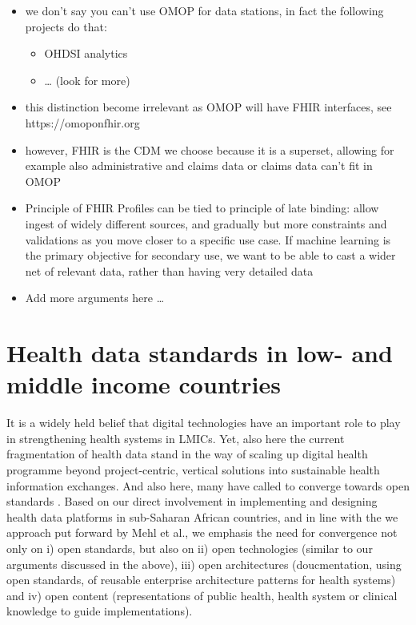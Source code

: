 \documentclass[
  authoryear]{elsarticle}
\providecommand{\tightlist}{%
  \setlength{\itemsep}{0pt}\setlength{\parskip}{0pt}}\usepackage{longtable,booktabs,array}
\begin{document}
\begin{itemize}
\item
  we don't say you can't use OMOP for data stations, in fact the
  following projects do that:

  \begin{itemize}
  \tightlist
  \item
    OHDSI analytics \citep{khalid2021standardized}
  \item
    \ldots{} (look for more)
  \end{itemize}
\item
  this distinction become irrelevant as OMOP will have FHIR interfaces,
  see https://omoponfhir.org
\item
  however, FHIR is the CDM we choose because it is a superset, allowing
  for example also administrative and claims data or claims data can't
  fit in OMOP
\item
  Principle of FHIR Profiles can be tied to principle of late binding:
  allow ingest of widely different sources, and gradually but more
  constraints and validations as you move closer to a specific use case.
  If machine learning is the primary objective for secondary use, we
  want to be able to cast a wider net of relevant data, rather than
  having very detailed data
\item
  Add more arguments here \ldots{}
\end{itemize}

\section{Health data standards in low- and middle income
countries}\label{health-data-standards-in-low--and-middle-income-countries}

It is a widely held belief that digital technologies have an important
role to play in strengthening health systems in LMICs. Yet, also here
the current fragmentation of health data stand in the way of scaling up
digital health programme beyond project-centric, vertical solutions into
sustainable health information exchanges. And also here, many have
called to converge towards open standards \citep{mehl2023fullstac}.
Based on our direct involvement in implementing and designing health
data platforms in sub-Saharan African countries, and in line with the we
approach put forward by Mehl et al., we emphasis the need for
convergence not only on i) open standards, but also on ii) open
technologies (similar to our arguments discussed in the above), iii)
open architectures (doucmentation, using open standards, of reusable
enterprise architecture patterns for health systems) and iv) open
content (representations of public health, health system or clinical
knowledge to guide implementations).
\end{document}

